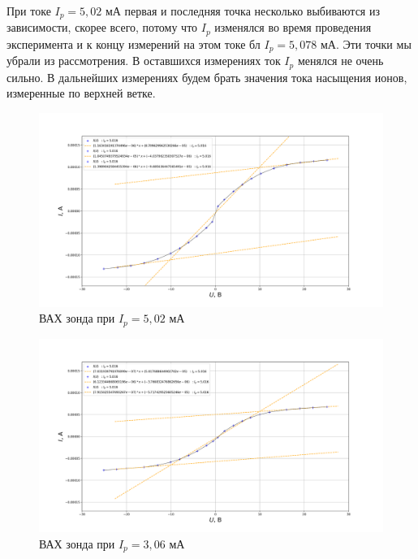 \documentclass{lab}
\begin{document}
При токе $I_p = 5,02$ мА первая и последняя точка несколько выбиваются из зависимости, скорее всего, потому что $I_p$ изменялся во время проведения эксперимента и к концу измерений на этом токе бл $I_p = 5,078$ мА. Эти точки мы убрали из рассмотрения. В оставшихся измерениях ток $I_p$ менялся не очень сильно. В дальнейших измерениях будем брать значения тока насыщения ионов, измеренные по верхней ветке.

\begin{figure}[H]
    \centering
    \includegraphics[width = \textwidth]{graph3.png}
    \caption{ВАХ зонда при $I_p = 5,02$ мА}
\end{figure}

\begin{figure}[H]
    \centering
    \includegraphics[width = \textwidth]{graph4.png}
    \caption{ВАХ зонда при $I_p = 3,06$ мА}
\end{figure}
\end{document}
